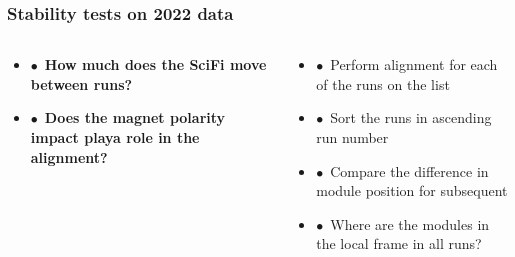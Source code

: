 \documentclass[aspectratio=1610, 12pt, xcolor=dvipsnames]{beamer}
\begin{document}
\begin{frame}\frametitle{Stability tests on 2022 data}
  \begin{columns}
    \begin{column}[c]{0.4\textwidth}
      \begin{itemize}
        \setlength\itemsep{1em}
        \item $\bullet$\, \textbf{How much does the SciFi move between runs?}
        \item $\bullet$\, \textbf{Does the magnet polarity impact playa role in the alignment?}
      \end{itemize}
    \end{column}
    \begin{column}[c]{0.6\textwidth}
      \begin{itemize}
        \item $\bullet$\, Perform alignment for each of the runs on the list
        \item $\bullet$\, Sort the runs in ascending run number
        \item $\bullet$\, Compare the difference in module position for subsequent
        \item $\bullet$\, Where are the modules in the local frame in all runs?
      \end{itemize}
    \end{column}
  \end{columns}
\end{frame}
\end{document}
